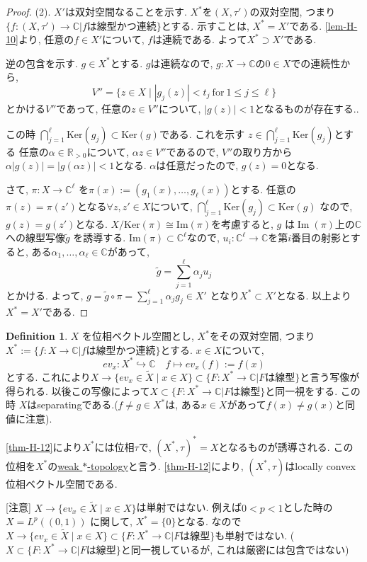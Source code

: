 \documentclass[dvipdfmx,a4paper,11pt]{article} %
\theoremstyle{definition}
\newtheorem{defn}[thm]{Definition}
\theoremstyle{remark}
\numberwithin{equation}{section}
\newcommand{\Ker}[1]{\mathrm{Ker}(#1)}
\newcommand{\C}{\mathbb{C}}
\begin{document}
\begin{proof}
(2). $X'$は双対空間なることを示す. 
\( X^* \)を\( (X, \tau') \)の双対空間, つまり$\{f : (X, \tau') \to \C | \text{$f$は線型かつ連続}\}$とする. 
示すことは,  \( X^* = X' \)である. 
\ref{lem-H-10}より, 任意の\(f \in X'\)について,  \(f\)は連続である. よって\( X^* \supset X'\)である. 

逆の包含を示す. \( g \in X^* \)とする. 
\(g\)は連続なので, $g : X \to \C$の$0 \in X$での連続性から, 
\[
V'' = \{ z \in X \mid |g_j(z)| < t_j \ \text{for} \ 1 \le j \le \ell \}
\]
とかける$V''$であって, 任意の$ z \in V''$について,  \(|g(z)| < 1\)となるものが存在する..

この時 \(\bigcap_{j=1}^\ell \Ker{g_j} \subset \Ker{g}\)である. これを示す
\( z \in \bigcap_{j=1}^\ell \Ker{g_j} \)とする 
任意の\( \alpha \in \mathbb{R}_{>0}\)について, \(\alpha z \in V''\)であるので, $V''$の取り方から
\(\alpha |g(z)| = |g(\alpha z)| < 1\)となる. $\alpha$は任意だったので, $g(z) = 0$となる. 

さて, \( \pi : X \to \mathbb{C}^\ell \) を\(\pi(x) := (g_1(x), \dots, g_\ell(x))\)とする. 
任意の\(\pi(z) = \pi(z')\)となる\(\forall z, z' \in X\)について, \(\bigcap_{j=1}^\ell \Ker{g_j} \subset \Ker{g} \)
なので, \(g(z) = g(z')\)となる. 
$X / \Ker{\pi} \cong \mathrm{Im} (\pi)$を考慮すると, \(g\) は\(\operatorname{Im}(\pi)\)上の$\C$への線型写像\(\widetilde{g}\) を誘導する. 
$\mathrm{Im}(\pi) \subset \mathbb{C}^\ell$なので, 
$u_i : \mathbb{C}^\ell \to \C$を第$i$番目の射影とすると, 
ある\(\alpha_1, \dots, \alpha_\ell \in \mathbb{C}\)があって, 
\[
\widetilde{g} = \sum_{j=1}^\ell \alpha_j u_j 
\]
とかける. よって, 
\(
g = \widetilde{g} \circ \pi = \sum_{j=1}^\ell \alpha_j g_j \in X'
\)
となり\(X^* \subset X'\)となる. 以上より\(X^* = X'\)である. 
\end{proof}

\begin{tcolorbox}[mybox]
\begin{defn}{\cite[3.14]{Rud}}
\label{defn-H-13}
\(X\) を位相ベクトル空間とし, \(X^*\)をその双対空間, つまり$X^*:=\{f : X \to \C | \text{$f$は線型かつ連続}\}$とする. 
$x \in X$について, 
\[
ev_x : X^{*} \hookrightarrow \C 
\quad 
f \mapsto ev_x(f) := f(x)
\]
とする. 
これにより$X \to \{ ev_x \in \widetilde{X} \mid x \in X \} \subset \{F: X^{*} \to \C | \text{$F$は線型}\}$と言う写像が得られる. 
以後この写像によって$X \subset \{F: X^{*} \to \C | \text{$F$は線型}\}$と同一視をする.
この時 \(X\)はseparatingである.(\(f \neq  g\in X^{*}\)は, ある$x \in X$があって\(f(x) \ne g(x)\)と同値に注意).

\ref{thm-H-12}により$X^{*}$には位相$\tau$で, $(X^*, \tau)^{*}=X$となるものが誘導される.
この位相を\(X^{*}\)の\underline{weak \( * \)-topology}と言う. 
\ref{thm-H-12}により, \((X^*, \tau)\)はlocally convex 位相ベクトル空間である. 
\end{defn}
\end{tcolorbox}
[注意] $X \to \{ ev_x \in \widetilde{X} \mid x \in X \}$は単射ではない. 
例えば$0 < p < 1$とした時の\( X = L^p((0,1)) \) に関して, $X^*=\{0\}$となる. 
なので$X \to \{ ev_x \in \widetilde{X} \mid x \in X \} \subset \{F: X^{*} \to \C | \text{$F$は線型}\}$も単射ではない. 
($X \subset \{F: X^{*} \to \C | \text{$F$は線型}\}$と同一視しているが, これは厳密には包含ではない)
\end{document}
